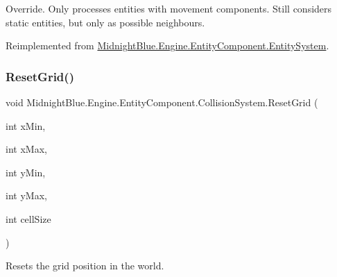 Override. Only processes entities with movement components. Still considers static entities, but only as possible neighbours. 



Reimplemented from \hyperlink{class_midnight_blue_1_1_engine_1_1_entity_component_1_1_entity_system_a3c740dc07a8f53fb9a1ae0769833d5ad}{Midnight\+Blue.\+Engine.\+Entity\+Component.\+Entity\+System}.

\hypertarget{class_midnight_blue_1_1_engine_1_1_entity_component_1_1_collision_system_a2a394fb18708d26f3748d8006b4f692d}{}\label{class_midnight_blue_1_1_engine_1_1_entity_component_1_1_collision_system_a2a394fb18708d26f3748d8006b4f692d} 
\subsubsection{\texorpdfstring{Reset\+Grid()}{ResetGrid()}}
{\footnotesize\ttfamily void Midnight\+Blue.\+Engine.\+Entity\+Component.\+Collision\+System.\+Reset\+Grid (\begin{DoxyParamCaption}\item[{int}]{x\+Min,  }\item[{int}]{x\+Max,  }\item[{int}]{y\+Min,  }\item[{int}]{y\+Max,  }\item[{int}]{cell\+Size }\end{DoxyParamCaption})\hspace{0.3cm}{\ttfamily [inline]}}



Resets the grid position in the world. 


